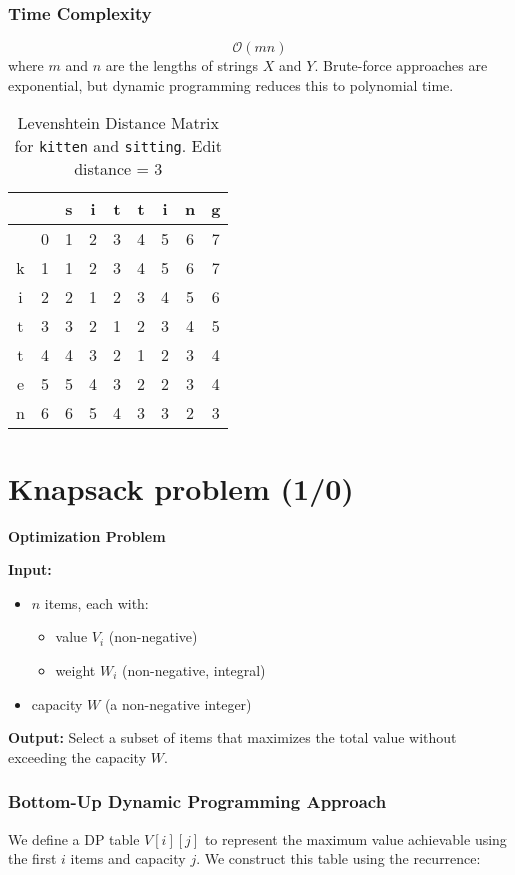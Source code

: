 \documentclass{article}
\begin{document}
\subsubsection*{Time Complexity}
\[
\mathcal{O}(mn)
\]
where $m$ and $n$ are the lengths of strings $X$ and $Y$. Brute-force approaches are exponential, but dynamic programming reduces this to polynomial time.

\begin{table}[h!]
\centering
\begin{tabular}{c|cccccccc}
  &   & s & i & t & t & i & n & g \\
\hline
  & 0 & 1 & 2 & 3 & 4 & 5 & 6 & 7 \\
k & 1 & 1 & 2 & 3 & 4 & 5 & 6 & 7 \\
i & 2 & 2 & 1 & 2 & 3 & 4 & 5 & 6 \\
t & 3 & 3 & 2 & 1 & 2 & 3 & 4 & 5 \\
t & 4 & 4 & 3 & 2 & 1 & 2 & 3 & 4 \\
e & 5 & 5 & 4 & 3 & 2 & 2 & 3 & 4 \\
n & 6 & 6 & 5 & 4 & 3 & 3 & 2 & 3 \\
\end{tabular}
\caption{Levenshtein Distance Matrix for \texttt{kitten} and \texttt{sitting}. Edit distance = 3}
\end{table}

\section{Knapsack problem (1/0)}

\textbf{Optimization Problem}

\textbf{Input:}
\begin{itemize}
    \item $n$ items, each with:
    \begin{itemize}
        \item value $V_i$ (non-negative)
        \item weight $W_i$ (non-negative, integral)
    \end{itemize}
    \item capacity $W$ (a non-negative integer)
\end{itemize}

\textbf{Output:} Select a subset of items that maximizes the total value without exceeding the capacity $W$.

\subsubsection*{Bottom-Up Dynamic Programming Approach}
We define a DP table $V[i][j]$ to represent the maximum value achievable using the first $i$ items and capacity $j$. We construct this table using the recurrence:
\end{document}
